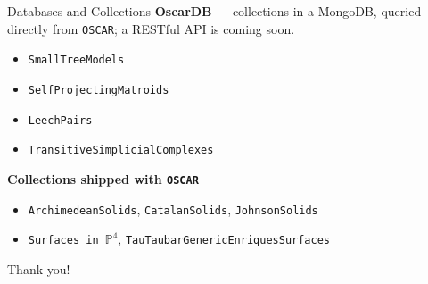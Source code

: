 \documentclass[9pt]{beamer}
\newcommand{\OSCAR}{\texttt{OSCAR}\xspace}
\begin{document}
\begin{frame}[fragile]{Databases and Collections}
  \textbf{OscarDB} --- collections in a MongoDB, queried directly from \OSCAR;
  a RESTful API is coming soon. \pause
  \begin{itemize}
  \item \texttt{SmallTreeModels}
  \item \texttt{SelfProjectingMatroids}
  \item \texttt{LeechPairs} 
  \item \texttt{TransitiveSimplicialComplexes}
  \end{itemize}
  \pause
  \vspace{0.2cm}
  \textbf{Collections shipped with \OSCAR}
  \begin{itemize}
  \item \texttt{ArchimedeanSolids}, \texttt{CatalanSolids},
    \texttt{JohnsonSolids}
  \item \texttt{Surfaces in $\mathbb{P}^4$}, \texttt{TauTaubarGenericEnriquesSurfaces}
  \end{itemize}
\end{frame}


\begin{frame}[fragile]{}
  \vfill
  \begin{center}
    \Large Thank you!
  \end{center}
  \vfill
\end{frame}
\end{document}
